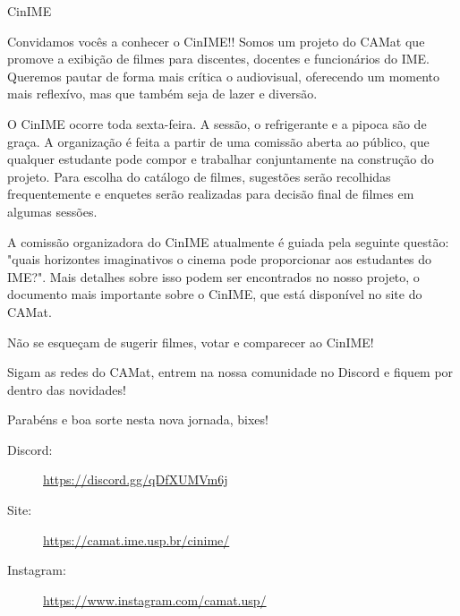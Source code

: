 \begin{subsecao}{CinIME}


Convidamos vocês a conhecer o CinIME!! Somos um projeto do CAMat que promove a
exibição de filmes para discentes, docentes e funcionários do IME. Queremos pautar
de forma mais crítica o audiovisual, oferecendo um momento mais reflexívo, mas que 
também seja de lazer e diversão.

O CinIME ocorre toda sexta-feira. A sessão, o refrigerante e a pipoca são de graça. 
A organização é feita a partir de uma comissão aberta ao público, que
qualquer estudante pode compor e trabalhar conjuntamente na construção do projeto. 
Para escolha do catálogo de filmes, sugestões serão recolhidas
frequentemente e enquetes serão realizadas para decisão final de filmes em algumas
sessões.

A comissão organizadora do CinIME atualmente é guiada pela seguinte questão: "quais 
horizontes imaginativos o cinema pode proporcionar aos estudantes do IME?". Mais detalhes
sobre isso podem ser encontrados no nosso projeto, o documento mais importante sobre o 
CinIME, que está disponível no site do CAMat.

Não se esqueçam de sugerir filmes, votar e comparecer ao CinIME!

Sigam as redes do CAMat, entrem na nossa comunidade no Discord e fiquem por dentro das novidades!

Parabéns e boa sorte nesta nova jornada, bixes!

\begin{description}
  \item[Discord:] \url{https://discord.gg/qDfXUMVm6j}
  \item[Site:] \url{https://camat.ime.usp.br/cinime/}
  \item[Instagram:] \url{https://www.instagram.com/camat.usp/}
\end{description}

\end{subsecao}
